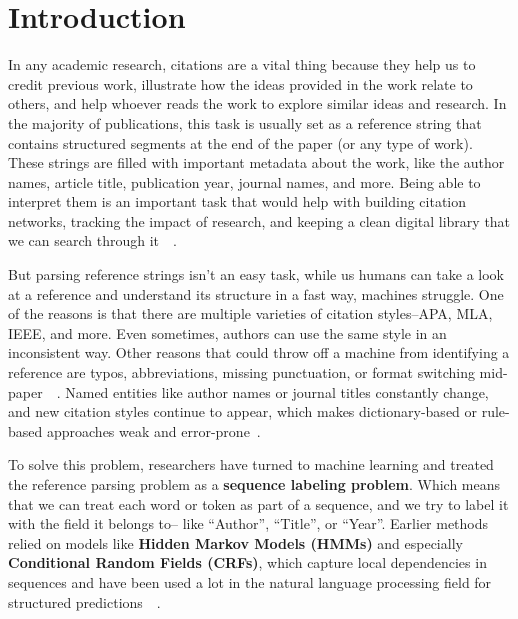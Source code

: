 \chapter{Introduction}
\label{ch:intro}

In any academic research, citations are a vital thing because they help us to credit previous work, illustrate how the ideas provided in the work relate to others, and help whoever reads the work to explore similar ideas and research. In the majority of publications, this task is usually set as a reference string that contains structured segments at the end of the paper (or any type of work). These strings are filled with important metadata about the work, like the author names, article title, publication year, journal names, and more. Being able to interpret them is an important task that would help with building citation networks, tracking the impact of research, and keeping a clean digital library that we can search through it~\cite{councill-etal-2008-parscit}~\cite{prasad2018neuralparscit}.

But parsing reference strings isn’t an easy task, while us humans can take a look at a reference and understand its structure in a fast way, machines struggle. One of the reasons is that there are multiple varieties of citation styles–APA, MLA, IEEE, and more. Even sometimes, authors can use the same style in an inconsistent way. Other reasons that could throw off a machine from identifying a reference are typos, abbreviations, missing punctuation, or format switching mid-paper~\cite{councill-etal-2008-parscit}~\cite{prasad2018neuralparscit}. Named entities like author names or journal titles constantly change, and new citation styles continue to appear, which makes dictionary-based or rule-based approaches weak and error-prone~\cite{prasad2018neuralparscit}.

To solve this problem, researchers have turned to machine learning and treated the reference parsing problem as a \textbf{sequence labeling problem}. Which means that we can treat each word or token as part of a sequence, and we try to label it with the field it belongs to– like “Author”, “Title”, or “Year”. Earlier methods relied on models like \textbf{Hidden Markov Models (HMMs)} and especially \textbf{Conditional Random Fields (CRFs)}, which capture local dependencies in sequences and have been used a lot in the natural language processing field for structured predictions~\cite{HMM1165342}~\cite{crf2001}.

